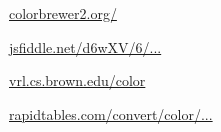 \begin{description}[font=\normalfont,itemsep=0pt]
    \item[Colorbrewer 2]
        \href{http://colorbrewer2.org/#type=sequential&scheme=BuGn&n=9}{colorbrewer2.org/}

    \item[LCH gradient picker]
        \href{http://jsfiddle.net/d6wXV/6/embedded/result/}{jsfiddle.net/d6wXV/6/...}

    \item[Colorgorical]
        \href{http://vrl.cs.brown.edu/color}{vrl.cs.brown.edu/color}

    \item[HEX 2 RGB]
        \href{https://www.rapidtables.com/convert/color/hex-to-rgb.html}{rapidtables.com/convert/color/...}

\end{description}
